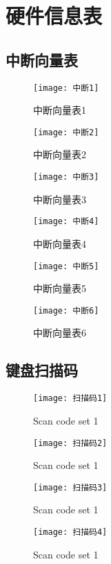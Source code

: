 \chapter{硬件信息表}%
\section{中断向量表}
\label{sec:zdxlb}
\begin{figure}[H]
  \centering
  \texttt{[image: 中断1]}
  \caption{中断向量表1}
  \label{fig:itpt1}
\end{figure}
\begin{figure}[H]
  \centering
  \texttt{[image: 中断2]}
  \caption{中断向量表2}
  \label{fig:itpt2}
\end{figure}
\begin{figure}[H]
  \centering
  \texttt{[image: 中断3]}
  \caption{中断向量表3}
  \label{fig:itpt3}
\end{figure}
\begin{figure}[H]
  \centering
  \texttt{[image: 中断4]}
  \caption{中断向量表4}
  \label{fig:itpt4}
\end{figure}
\begin{figure}[H]
  \centering
  \texttt{[image: 中断5]}
  \caption{中断向量表5}
  \label{fig:itpt5}
\end{figure}
\begin{figure}[H]
  \centering
  \texttt{[image: 中断6]}
  \caption{中断向量表6}
  \label{fig:itpt6}
\end{figure}

\section{键盘扫描码}
\label{sec:key}
\begin{figure}[H]
  \centering
  \texttt{[image: 扫描码1]}
  \caption{Scan code set 1}
  \label{fig:key1}
\end{figure}
\begin{figure}[H]
  \centering
  \texttt{[image: 扫描码2]}
  \caption{Scan code set 1}
  \label{fig:key2}
\end{figure}
\begin{figure}[H]
  \centering
  \texttt{[image: 扫描码3]}
  \caption{Scan code set 1}
  \label{fig:key3}
\end{figure}
\begin{figure}[H]
  \centering
  \texttt{[image: 扫描码4]}
  \caption{Scan code set 1}
  \label{fig:key4}
\end{figure}
